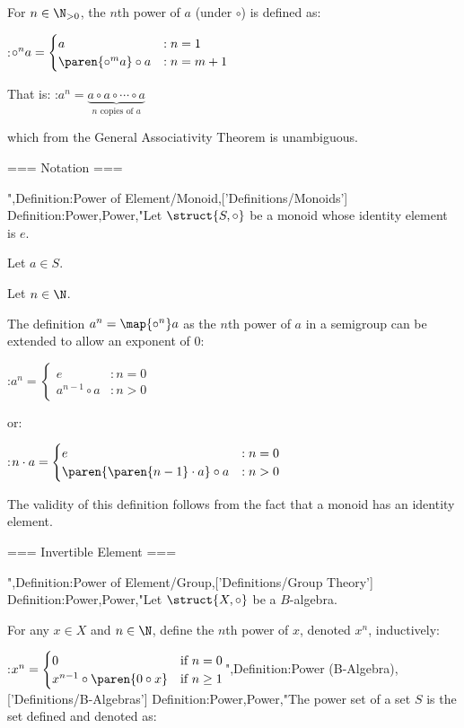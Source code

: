 For $n \in \N_{>0}$, the $n$th power of $a$ (under $\circ$) is defined as:

:$\circ^n a = \begin{cases} a & : n = 1 \\ \paren {\circ^m a} \circ a & : n = m + 1 \end{cases}$

That is:
:$a^n = \underbrace {a \circ a \circ \cdots \circ a}_{n \text{ copies of } a}$

which from the General Associativity Theorem is unambiguous.


=== Notation ===

",Definition:Power of Element/Monoid,['Definitions/Monoids']
Definition:Power,Power,"Let $\struct {S, \circ}$ be a monoid whose identity element is $e$.

Let $a \in S$.

Let $n \in \N$.


The definition $a^n = \map {\circ^n} a$ as the $n$th power of $a$ in a semigroup can be extended to allow an exponent of $0$:

:$a^n = \begin {cases}
e & : n = 0 \\
a^{n - 1} \circ a & : n > 0
\end{cases}$

or:

:$n \cdot a = \begin {cases}
e & : n = 0 \\
\paren {\paren {n - 1} \cdot a} \circ a & : n > 0
\end{cases}$


The validity of this definition follows from the fact that a monoid has an identity element.


=== Invertible Element ===

",Definition:Power of Element/Group,['Definitions/Group Theory']
Definition:Power,Power,"Let $\struct {X, \circ}$ be a $B$-algebra.

For any $x \in X$ and $n \in \N$, define the $n$th power of $x$, denoted $x^n$, inductively:

:$x^n = \begin{cases}
0 & \text {if $n = 0$} \\
x^{n - 1} \circ \paren {0 \circ x} & \text {if $n \ge 1$}
\end{cases}$",Definition:Power (B-Algebra),['Definitions/B-Algebras']
Definition:Power,Power,"The power set of a set $S$ is the set defined and denoted as:

